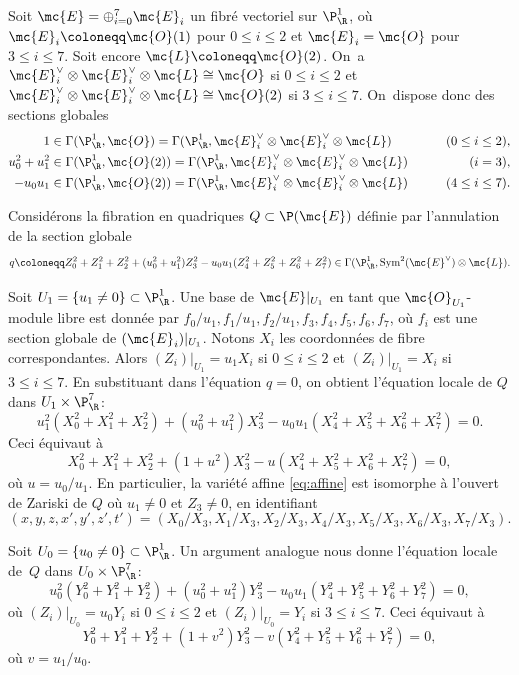 Soit $\mc{E}=\oplus_{i=0}^7\mc{E}_i$ un fibré vectoriel sur $\P^1_\R$, où $\mc{E}_i\coloneqq \mc{O}(1)$ pour $0\leq i\leq 2$ et $\mc{E}_i=\mc{O}$ pour $3\leq i\leq 7$. Soit encore $\mc{L}\coloneqq \mc{O}(2)$. On~a $\mc{E}_i^\vee\otimes \mc{E}_i^\vee\otimes \mc{L}\cong \mc{O}$ si $0\leq i\leq 2$ et $\mc{E}_i^\vee\otimes \mc{E}_i^\vee\otimes \mc{L}\cong \mc{O}(2)$ si $3\leq i\leq 7$. On~dispose donc des sections globales
\begin{align*}
1&\in \Gamma(\P^1_\R,\mc{O})=\Gamma(\P^1_\R, \mc{E}_i^\vee\otimes \mc{E}_i^\vee\otimes \mc{L})\qquad &(0\leq i\leq 2), \\
u_0^2+u_1^2&\in \Gamma(\P^1_\R,\mc{O}(2))=\Gamma(\P^1_\R, \mc{E}_i^\vee\otimes \mc{E}_i^\vee\otimes \mc{L})\qquad &(i=3),\\
-u_0u_1& \in \Gamma(\P^1_\R,\mc{O}(2))=\Gamma(\P^1_\R, \mc{E}_i^\vee\otimes \mc{E}_i^\vee\otimes \mc{L})\qquad &(4\leq i\leq 7).
\end{align*}

Considérons la fibration en quadriques $Q \subset \P(\mc{E})$ définie par l'annulation de la section globale
\[
q \coloneqq Z_0^2 + Z_1^2 + Z_2^2 + (u_0^2+u_1^2)Z_3^2 - u_0u_1(Z_4^2 + Z_5^2 + Z_6^2 + Z_7^2)\in \Gamma(\P^1_\R,\mathrm{Sym}^2(\mc{E}^\vee) \otimes \mc{L}).
\]

Soit $U_1=\{u_1\neq 0\}\subset \P^1_\R$. Une base de $\mc{E}|_{U_1}$ en tant que $\mc{O}_{U_1}$-module libre est donnée par $f_0/u_1, f_1/u_1, f_2/u_1, f_3, f_4, f_5, f_6, f_7$, où $f_i$ est une section globale de $(\mc{E}_i)|_{U_1}$. Notons $X_i$ les coordonnées de fibre correspondantes. Alors $(Z_i)|_{U_1}=u_1X_i$ si $0\leq i\leq 2$ et $(Z_i)|_{U_1}=X_i$ si $3\leq i\leq 7$.
En substituant dans l'équation $q=0$, on obtient l'équation locale de $Q$ dans $U_1 \times \P^7_\R$:
\[
u_1^2(X_0^2+X_1^2+X_2^2) + (u_0^2+u_1^2)X_3^2 - u_0u_1(X_4^2+X_5^2+X_6^2+X_7^2) = 0.
\]
Ceci équivaut à
\begin{equation} \label{eq:local_S}
X_0^2+X_1^2+X_2^2 + (1+u^2)X_3^2 - u(X_4^2+X_5^2+X_6^2+X_7^2) = 0,
\end{equation}
où $u=u_0/u_1$. En particulier, la variété affine \eqref{eq:affine} est isomorphe à l'ouvert de Zariski de $Q$ où $u_1\neq 0$ et $Z_3\neq 0$, en identifiant
\[(x,y,z,x',y',z',t')=(X_0/X_3,X_1/X_3,X_2/X_3,X_4/X_3,X_5/X_3,X_6/X_3,X_7/X_3).\]

Soit $U_0=\{u_0\neq 0\}\subset \P^1_\R$. Un argument analogue nous donne l'équation locale de~$Q$ dans $U_0 \times \P^7_\R$:
\[
u_0^2(Y_0^2+Y_1^2+Y_2^2) + (u_0^2+u_1^2)Y_3^2 - u_0u_1(Y_4^2+Y_5^2+Y_6^2+Y_7^2) = 0,
\]
où $(Z_i)|_{U_0}=u_0Y_i$ si $0\leq i\leq 2$ et $(Z_i)|_{U_0}=Y_i$ si $3\leq i\leq 7$.
Ceci équivaut à
\begin{equation} \label{eq:local_T}
Y_0^2+Y_1^2+Y_2^2 + (1+v^2)Y_3^2 - v(Y_4^2+Y_5^2+Y_6^2+Y_7^2) = 0,
\end{equation}
où $v=u_1/u_0$.

